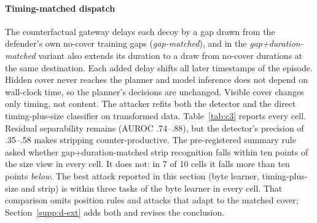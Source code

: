 \paragraph{Timing-matched dispatch}
The counterfactual gateway delays each decoy by a gap drawn from the defender's own no-cover training gaps (\emph{gap-matched}), and in the \emph{gap+duration-matched} variant also extends its duration to a draw from no-cover durations at the same destination. Each added delay shifts all later timestamps of the episode. Hidden cover never reaches the planner and model inference does not depend on wall-clock time, so the planner's decisions are unchanged. Visible cover changes only timing, not content. The attacker refits both the detector and the direct timing-plus-size classifier on transformed data. Table~\ref{tab:c3} reports every cell. Residual separability remains (AUROC .74--.88), but the detector's precision of .35--.58 makes stripping counter-productive. The pre-registered summary rule asked whether gap+duration-matched strip recognition falls within ten points of the size view in every cell. It does not: in 7 of 10 cells it falls more than ten points \emph{below}. The best attack reported in this section (byte learner, timing-plus-size and strip) is within three tasks of the byte learner in every cell. That comparison omits position rules and attacks that adapt to the matched cover; Section~\ref{supp:d-ext} adds both and revises the conclusion.




